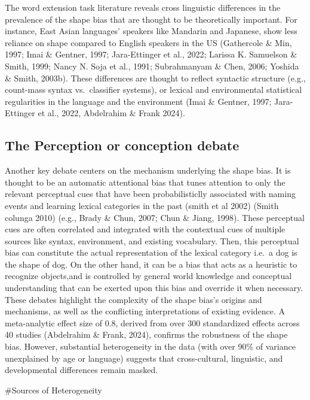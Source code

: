\documentclass[10pt, letterpaper]{article}
\begin{document}
The word extension task literature reveals cross linguistic differences
in the prevalence of the shape bias that are thought to be theoretically
important. For instance, East Asian languages' speakers like Mandarin
and Japanese, show less reliance on shape compared to English speakers
in the US (Gathercole \& Min, 1997; Imai \& Gentner, 1997; Jara-Ettinger
et al., 2022; Larissa K. Samuelson \& Smith, 1999; Nancy N. Soja et al.,
1991; Subrahmanyam \& Chen, 2006; Yoshida \& Smith, 2003b). These
differences are thought to reflect syntactic structure (e.g., count-mass
syntax vs.~classifier systems), or lexical and environmental statistical
regularities in the language and the environment (Imai \& Gentner, 1997;
Jara-Ettinger et al., 2022, Abdelrahim \& Frank 2024).

\hypertarget{the-perception-or-conception-debate}{%
\subsection{The Perception or conception
debate}\label{the-perception-or-conception-debate}}

Another key debate centers on the mechanism underlying the shape bias.
It is thought to be an automatic attentional bias that tunes attention
to only the relevant perceptual cues that have been probabilisticlly
associated with naming events and learning lexical categories in the
past (smith et al 2002) (Smith colunga 2010) (e.g., Brady \& Chun, 2007;
Chun \& Jiang, 1998). These perceptual cues are often correlated and
integrated with the contextual cues of multiple sources like syntax,
environment, and existing vocabulary. Then, this perceptual bias can
constitute the actual representation of the lexical category i.e.~a dog
is the shape of dog. On the other hand, it can be a bias that acts as a
heuristic to recognize objects,and is controlled by general world
knowledge and conceptual understanding that can be exerted upon this
bias and override it when necessary. These debates highlight the
complexity of the shape bias's origins and mechanisms, as well as the
conflicting interpretations of existing evidence. A meta-analytic effect
size of 0.8, derived from over 300 standardized effects across 40
studies (Abdelrahim \& Frank, 2024), confirms the robustness of the
shape bias. However, substantial heterogeneity in the data (with over
90\% of variance unexplained by age or language) suggests that
cross-cultural, linguistic, and developmental differences remain masked.

\#Sources of Heterogeneity
\end{document}
